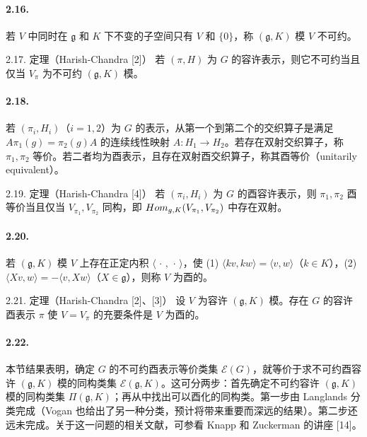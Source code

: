 \paragraph*{2.16.} 若 $V$ 中同时在 $\mathfrak g$ 和 $K$ 下不变的子空间只有 $V$ 和 $\{0\}$，称 $(\mathfrak g,K)$ 模 $V$ 不可约。
\begin{originaltheorem}{2.17. 定理（Harish-Chandra [2]）}
若 $(\pi,H)$ 为 $G$ 的容许表示，则它不可约当且仅当 $V_\pi$ 为不可约 $(\mathfrak g,K)$ 模。
\end{originaltheorem}
\paragraph*{2.18.} 若 $(\pi_i,H_i)$（$i=1,2$）为 $G$ 的表示，从第一个到第二个的交织算子是满足 $A\pi_1(g)=\pi_2(g)A$ 的连续线性映射 $A:H_1\to H_2$。若存在双射交织算子，称 $\pi_1,\pi_2$ 等价。若二者均为酉表示，且存在双射酉交织算子，称其酉等价（unitarily equivalent）。
\begin{originaltheorem}{2.19. 定理（Harish-Chandra [4]）}
若 $(\pi_i,H_i)$ 为 $G$ 的酉容许表示，则 $\pi_1,\pi_2$ 酉等价当且仅当 $V_{\pi_1},V_{\pi_2}$ 同构，即 $Hom_{g,K}(V_{\pi_1},V_{\pi_2})$ 中存在双射。
\end{originaltheorem}
\paragraph*{2.20.} 若 $(\mathfrak g,K)$ 模 $V$ 上存在正定内积 $\langle\,\cdot\,,\,\cdot\,\rangle$，使 (1) $\langle kv,kw\rangle=\langle v,w\rangle$（$k\in K$），(2) $\langle Xv,w\rangle=-\langle v,Xw\rangle$（$X\in\mathfrak g$），则称 $V$ 为酉的。
\begin{originaltheorem}{2.21. 定理（Harish-Chandra [2]、[3]）}
设 $V$ 为容许 $(\mathfrak g,K)$ 模。存在 $G$ 的容许酉表示 $\pi$ 使 $V=V_\pi$ 的充要条件是 $V$ 为酉的。
\end{originaltheorem}
\paragraph*{2.22.} 本节结果表明，确定 $G$ 的不可约酉表示等价类集 $\mathcal E(G)$，就等价于求不可约酉容许 $(\mathfrak g,K)$ 模的同构类集 $\mathcal E(\mathfrak g,K)$。这可分两步：首先确定不可约容许 $(\mathfrak g,K)$ 模的同构类集 $\Pi(\mathfrak g,K)$；再从中找出可以酉化的同构类。第一步由 Langlands 分类完成（Vogan 也给出了另一种分类，预计将带来重要而深远的结果）。第二步还远未完成。关于这一问题的相关文献，可参看 Knapp 和 Zuckerman 的讲座 [14]。

